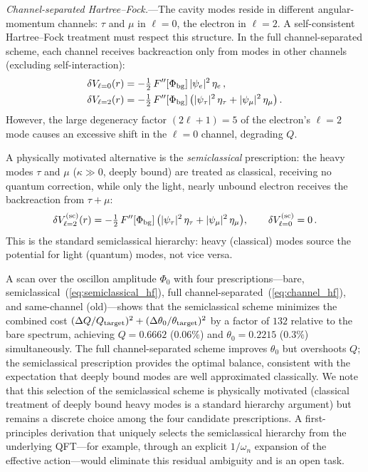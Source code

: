 \documentclass[aps,prd,onecolumn,superscriptaddress,nofootinbib,showpacs,12pt,notitlepage]{revtex4-2}
\begin{document}
\textit{Channel-separated Hartree--Fock.}---The cavity
modes reside in different angular-momentum channels:
$\tau$ and $\mu$ in $\ell = 0$, the electron in
$\ell = 2$.  A self-consistent Hartree--Fock treatment
must respect this structure.  In the full channel-separated
scheme, each channel receives backreaction only from modes
in other channels (excluding self-interaction):
\begin{align}\label{eq:channel_hf}
  \delta V_{\ell=0}(r) &= -\tfrac{1}{2}\,F''[\Phi_{\rm bg}]\,
    |\psi_{e}|^{2}\,\eta_{e}\,,\\
  \delta V_{\ell=2}(r) &= -\tfrac{1}{2}\,F''[\Phi_{\rm bg}]\,
    \bigl(|\psi_{\tau}|^{2}\,\eta_{\tau}
    + |\psi_{\mu}|^{2}\,\eta_{\mu}\bigr)\,.
\end{align}
However, the large degeneracy factor $(2\ell+1) = 5$
of the electron's $\ell = 2$ mode causes an excessive
shift in the $\ell = 0$ channel, degrading $Q$.

A physically motivated alternative is the
\emph{semiclassical} prescription: the heavy modes
$\tau$ and $\mu$ ($\kappa \gg 0$, deeply bound)
are treated as classical, receiving no quantum
correction, while only the light, nearly unbound
electron receives the backreaction from $\tau + \mu$:
\begin{equation}\label{eq:semiclassical_hf}
  \delta V_{\ell=2}^{\rm (sc)}(r) =
  -\tfrac{1}{2}\,F''[\Phi_{\rm bg}]\,
  \bigl(|\psi_{\tau}|^{2}\,\eta_{\tau}
  + |\psi_{\mu}|^{2}\,\eta_{\mu}\bigr),\qquad
  \delta V_{\ell=0}^{\rm (sc)} = 0\,.
\end{equation}
This is the standard semiclassical hierarchy: heavy
(classical) modes source the potential for light
(quantum) modes, not vice versa.

A scan over the oscillon amplitude $\Phi_0$ with four
prescriptions---bare, semiclassical~(\ref{eq:semiclassical_hf}),
full channel-separated~(\ref{eq:channel_hf}), and
same-channel (old)---shows that the semiclassical scheme
minimizes the combined cost
$(\Delta Q/Q_{\rm target})^{2} + (\Delta\theta_0/\theta_{\rm target})^{2}$
by a factor of $132$ relative to the bare spectrum,
achieving $Q = 0.6662$ ($0.06\%$) and
$\theta_0 = 0.2215$ ($0.3\%$) simultaneously.  The
full channel-separated scheme improves $\theta_0$ but
overshoots $Q$; the semiclassical prescription provides
the optimal balance, consistent with the expectation
that deeply bound modes are well approximated classically.
We note that this selection of the semiclassical scheme is
physically motivated (classical treatment of deeply bound
heavy modes is a standard hierarchy argument) but remains
a discrete choice among the four candidate prescriptions.
A first-principles derivation that uniquely selects the
semiclassical hierarchy from the underlying QFT---for
example, through an explicit $1/\omega_n$ expansion of the
effective action---would eliminate this residual ambiguity
and is an open task.
\end{document}
